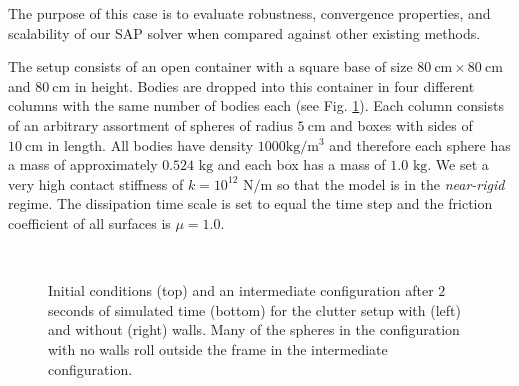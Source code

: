 The purpose of this case is to evaluate robustness, convergence properties, and
scalability of our SAP solver when compared against other existing methods.

The setup consists of an open container with a square base of size
$80~\text{cm}\times80~\text{cm}$ and $80~\text{cm}$ in height. Bodies are
dropped into this container in four different columns with the same number of
bodies each (see Fig. \ref{fig:clutter_snapshots}). Each column consists of an
arbitrary assortment of spheres of radius $5~\text{cm}$ and boxes with sides of
$10~\text{cm}$ in length. All bodies have density $1000\text{
kg}/\text{m}^3$ and therefore each sphere has a mass of approximately
$0.524\text{ kg}$ and each box has a mass of $1.0\text{ kg}$. We set a very high
contact stiffness of $k=10^{12}\text{ N}/\text{m}$ so that the model is in the
\emph{near-rigid} regime. The dissipation time scale is set to equal the time
step and the friction coefficient of all surfaces is $\mu=1.0$.
\begin{figure}[t]
    \centering
    \\
    \vspace{0.1cm}
    \caption{Initial conditions (top) and an intermediate configuration after $2$ seconds of
    simulated time (bottom) for the clutter setup with (left) and without
    (right) walls. Many of the spheres in the configuration with no walls
	roll outside the frame in the intermediate configuration.}
    \label{fig:clutter_snapshots}
\end{figure}

